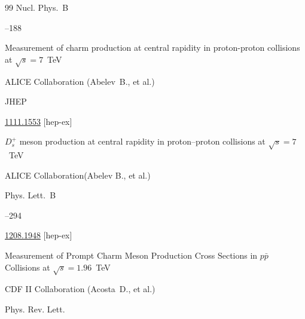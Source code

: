 \begin{thebibliography}{99}
\jour Nucl. Phys.~B



--188






\paper Measurement of charm production at central rapidity in proton-proton collisions at $\sqrt s=7$~TeV

\by ALICE Collaboration (Abelev~B.,  et al.) 

\jour JHEP 





\arxiv \href{http://arxiv.org/abs/1111.1553}{1111.1553} [hep-ex] 







\paper $D_s^+$ meson production at central rapidity in proton–proton collisions at $\sqrt s=7$~TeV

\by  ALICE Collaboration(Abelev B., et al.)

\jour  Phys. Lett.~B



–294


\arxiv \href{http://arxiv.org/abs/1208.1948}{1208.1948} [hep-ex]




\paper Measurement of Prompt Charm Meson Production Cross Sections in $p\bar p$ Collisions at $\sqrt s=1.96$~TeV

\by CDF II Collaboration   (Acosta~D., et al.)

\jour Phys. Rev. Lett. 







\end{thebibliography}
